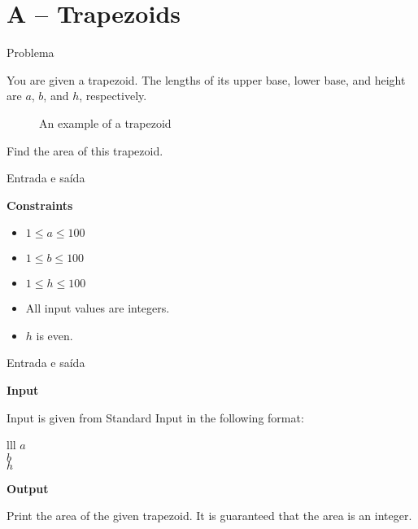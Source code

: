\section{A -- Trapezoids}

\begin{frame}[fragile]{Problema}

You are given a trapezoid. The lengths of its upper base, lower base, and height are $a$, $b$, and 
$h$, respectively.

\begin{figure}
    \centering

    \caption*{An example of a trapezoid}

\end{figure}

Find the area of this trapezoid.

\end{frame}

\begin{frame}[fragile]{Entrada e saída}

\textbf{Constraints}

\begin{itemize}
    \item $1\leq a\leq 100$
    \item $1\leq b\leq 100$
    \item $1\leq h\leq 100$
    \item All input values are integers.
    \item $h$ is even. 
\end{itemize}

\end{frame}

\begin{frame}[fragile]{Entrada e saída}

\textbf{Input}

Input is given from Standard Input in the following format:
\begin{atcoderio}{lll}
$a$ \\
$b$ \\
$h$ \\
\end{atcoderio}

\textbf{Output}

Print the area of the given trapezoid. It is guaranteed that the area is an integer.

\end{frame}

